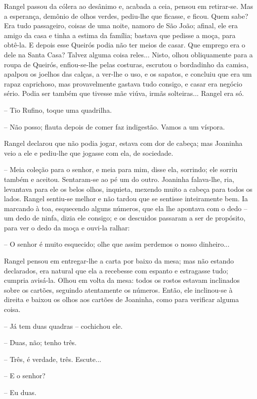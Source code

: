 Rangel passou da cólera ao desânimo e, acabada a ceia, pensou em
retirar-se. Mas a esperança, demônio de olhos verdes, pediu-lhe que
ficasse, e ficou. Quem sabe? Era tudo passageiro, coisas de uma noite,
namoro de São João; afinal, ele era amigo da casa e tinha a estima da
família; bastava que pedisse a moça, para obtê-la. E depois esse Queirós
podia não ter meios de casar. Que emprego era o dele na Santa Casa?
Talvez alguma coisa reles... Nisto, olhou obliquamente para a roupa de
Queirós, enfiou-se-lhe pelas costuras, escrutou o bordadinho da camisa,
apalpou os joelhos das calças, a ver-lhe o uso, e os sapatos, e concluiu
que era um rapaz caprichoso, mas provavelmente gastava tudo consigo, e
casar era negócio sério. Podia ser também que tivesse mãe viúva, irmãs
solteiras... Rangel era só.

-- Tio Rufino, toque uma quadrilha.

-- Não posso; flauta depois de comer faz indigestão. Vamos a um víspora.

Rangel declarou que não podia jogar, estava com dor de cabeça; mas
Joaninha veio a ele e pediu-lhe que jogasse com ela, de sociedade.

-- Meia coleção para o senhor, e meia para mim, disse ela, sorrindo; ele
sorriu também e aceitou. Sentaram-se ao pé um do outro. Joaninha
falava-lhe, ria, levantava para ele os belos olhos, inquieta, mexendo
muito a cabeça para todos os lados. Rangel sentiu-se melhor e não tardou
que se sentisse inteiramente bem. Ia marcando à toa, esquecendo alguns
números, que ela lhe apontava com o dedo -- um dedo de ninfa, dizia ele
consigo; e os descuidos passaram a ser de propósito, para ver o dedo da
moça e ouvi-la ralhar:

-- O senhor é muito esquecido; olhe que assim perdemos o nosso
dinheiro...

Rangel pensou em entregar-lhe a carta por baixo da mesa; mas não estando
declarados, era natural que ela a recebesse com espanto e estragasse
tudo; cumpria avisá-la. Olhou em volta da mesa: todos os rostos estavam
inclinados sobre os cartões, seguindo atentamente os números. Então, ele
inclinou-se à direita e baixou os olhos aos cartões de Joaninha, como
para verificar alguma coisa.

-- Já tem duas quadras -- cochichou ele.

-- Duas, não; tenho três.

-- Três, é verdade, três. Escute...

-- E o senhor?

-- Eu duas.

